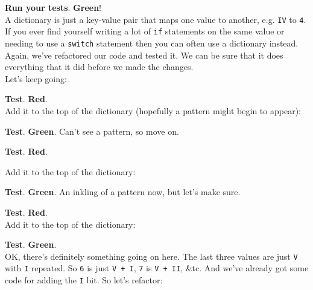 
\textbf{Run your tests}. \textbf{Green}!
\\

A dictionary is just a key-value pair that maps one value to another, e.g. \texttt{IV} to \texttt{4}. If you ever find yourself writing a lot of \texttt{if} statements on the same value or needing to use a \texttt{switch} statement then you can often use a dictionary instead.
\\

Again, we've refactored our code and tested it. We can be sure that it does everything that it did before we made the changes.
\\

Let's keep going:



\textbf{Test}. \textbf{Red}.
\\

Add it to the top of the dictionary (hopefully a pattern might begin to appear):



\textbf{Test}. \textbf{Green}. Can't see a pattern, so move on.



\textbf{Test}. \textbf{Red}.

\pagebreak

Add it to the top of the dictionary:



\textbf{Test}. \textbf{Green}. An inkling of a pattern now, but let's make sure.



\textbf{Test}. \textbf{Red}.
\\

Add it to the top of the dictionary:



\textbf{Test}. \textbf{Green}.
\\

OK, there's definitely something going on here. The last three values are just \texttt{V} with \texttt{I} repeated. So \texttt{6} is just \texttt{V + I}, \texttt{7} is \texttt{V + II}, \&tc. And we've already got some code for adding the \texttt{I} bit. So let's refactor:

